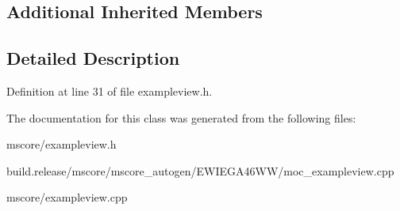 \subsection*{Additional Inherited Members}


\subsection{Detailed Description}


Definition at line 31 of file exampleview.\+h.



The documentation for this class was generated from the following files\+:\begin{DoxyCompactItemize}
\item 
mscore/exampleview.\+h\item 
build.\+release/mscore/mscore\+\_\+autogen/\+E\+W\+I\+E\+G\+A46\+W\+W/moc\+\_\+exampleview.\+cpp\item 
mscore/exampleview.\+cpp\end{DoxyCompactItemize}
